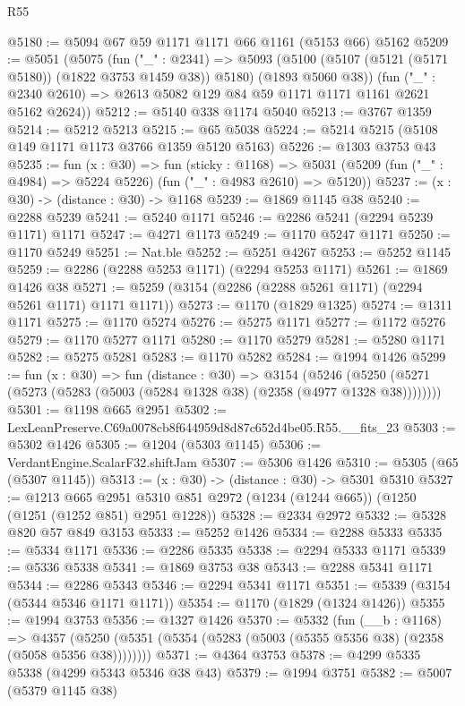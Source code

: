 \begin{lexlean}{R55}
\begin{coremodule}
@5180 := @5094 @67 @59 @1171 @1171 @66 @1161 (@5153 @66) @5162
@5209 := @5051
    (@5075
      (fun ("_" : @2341) =>
      @5093 (@5100 (@5107 (@5121 (@5171 @5180)) (@1822 @3753 @1459 @38)) @5180) (@1893 @5060 @38))
      (fun ("_" : @2340 @2610) => @2613 @5082 @129 @84 @59 @1171 @1171 @1161 @2621 @5162 @2624))
@5212 := @5140 @338 @1174 @5040
@5213 := @3767 @1359
@5214 := @5212 @5213
@5215 := @65 @5038
@5224 := @5214 @5215 (@5108 @149 @1171 @1173 @3766 @1359 @5120 @5163)
@5226 := @1303 @3753 @43
@5235 := fun (x : @30) =>
  fun (sticky : @1168) =>
  @5031 (@5209 (fun ("_" : @4984) => @5224 @5226) (fun ("_" : @4983 @2610) => @5120))
@5237 := (x : @30) -> (distance : @30) -> @1168
@5239 := @1869 @1145 @38
@5240 := @2288 @5239
@5241 := @5240 @1171
@5246 := @2286 @5241 (@2294 @5239 @1171) @1171
@5247 := @4271 @1173
@5249 := @1170 @5247 @1171
@5250 := @1170 @5249
@5251 := Nat.ble
@5252 := @5251 @4267
@5253 := @5252 @1145
@5259 := @2286 (@2288 @5253 @1171) (@2294 @5253 @1171)
@5261 := @1869 @1426 @38
@5271 := @5259 (@3154 (@2286 (@2288 @5261 @1171) (@2294 @5261 @1171) @1171 @1171))
@5273 := @1170 (@1829 @1325)
@5274 := @1311 @1171
@5275 := @1170 @5274
@5276 := @5275 @1171
@5277 := @1172 @5276
@5279 := @1170 @5277 @1171
@5280 := @1170 @5279
@5281 := @5280 @1171
@5282 := @5275 @5281
@5283 := @1170 @5282
@5284 := @1994 @1426
@5299 := fun (x : @30) =>
  fun (distance : @30) =>
  @3154 (@5246 (@5250 (@5271 (@5273 (@5283 (@5003 (@5284 @1328 @38) (@2358 (@4977 @1328 @38))))))))
@5301 := @1198 @665 @2951
@5302 := LexLeanPreserve.C69a0078cb8f644959d8d87c652d4be05.R55.__fits_23
@5303 := @5302 @1426
@5305 := @1204 (@5303 @1145)
@5306 := VerdantEngine.ScalarF32.shiftJam
@5307 := @5306 @1426
@5310 := @5305 (@65 (@5307 @1145))
@5313 := (x : @30) -> (distance : @30) -> @5301 @5310
@5327 := @1213
    @665
    @2951
    @5310
    @851
    @2972
    (@1234 (@1244 @665))
    (@1250 (@1251 (@1252 @851) @2951 @1228))
@5328 := @2334 @2972
@5332 := @5328 @820 @57 @849 @3153
@5333 := @5252 @1426
@5334 := @2288 @5333
@5335 := @5334 @1171
@5336 := @2286 @5335
@5338 := @2294 @5333 @1171
@5339 := @5336 @5338
@5341 := @1869 @3753 @38
@5343 := @2288 @5341 @1171
@5344 := @2286 @5343
@5346 := @2294 @5341 @1171
@5351 := @5339 (@3154 (@5344 @5346 @1171 @1171))
@5354 := @1170 (@1829 (@1324 @1426))
@5355 := @1994 @3753
@5356 := @1327 @1426
@5370 := @5332
    (fun (__b : @1168) =>
    @4357 (@5250 (@5351 (@5354 (@5283 (@5003 (@5355 @5356 @38) (@2358 (@5058 @5356 @38))))))))
@5371 := @4364 @3753
@5378 := @4299 @5335 @5338 (@4299 @5343 @5346 @38 @43)
@5379 := @1994 @3751
@5382 := @5007 (@5379 @1145 @38)

\end{coremodule}
\end{lexlean}
